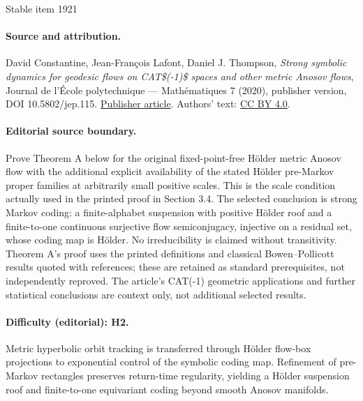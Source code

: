 \documentclass[11pt]{article}
\begin{document}
\begin{center}{\Large Stable item 1921}\end{center}
\paragraph{Source and attribution.}
David Constantine, Jean-François Lafont, Daniel J. Thompson, \emph{Strong symbolic dynamics for geodesic flows on CAT\$(-1)\$ spaces and other metric Anosov flows}, Journal de l’École polytechnique — Mathématiques 7 (2020), publisher version, DOI 10.5802/jep.115. \href{https://jep.centre-mersenne.org/articles/10.5802/jep.115/}{Publisher article}. Authors' text: \href{https://creativecommons.org/licenses/by/4.0/}{CC BY 4.0}.
\paragraph{Editorial source boundary.}
Prove Theorem A below for the original fixed-point-free Hölder metric Anosov flow with the additional explicit availability of the stated Hölder pre-Markov proper families at arbitrarily small positive scales. This is the scale condition actually used in the printed proof in Section 3.4. The selected conclusion is strong Markov coding: a finite-alphabet suspension with positive Hölder roof and a finite-to-one continuous surjective flow semiconjugacy, injective on a residual set, whose coding map is Hölder. No irreducibility is claimed without transitivity. Theorem A's proof uses the printed definitions and classical Bowen--Pollicott results quoted with references; these are retained as standard prerequisites, not independently reproved. The article's CAT(-1) geometric applications and further statistical conclusions are context only, not additional selected results.
\paragraph{Difficulty (editorial): H2.}
Metric hyperbolic orbit tracking is transferred through Hölder flow-box projections to exponential control of the symbolic coding map. Refinement of pre-Markov rectangles preserves return-time regularity, yielding a Hölder suspension roof and finite-to-one equivariant coding beyond smooth Anosov manifolds.
\end{document}

